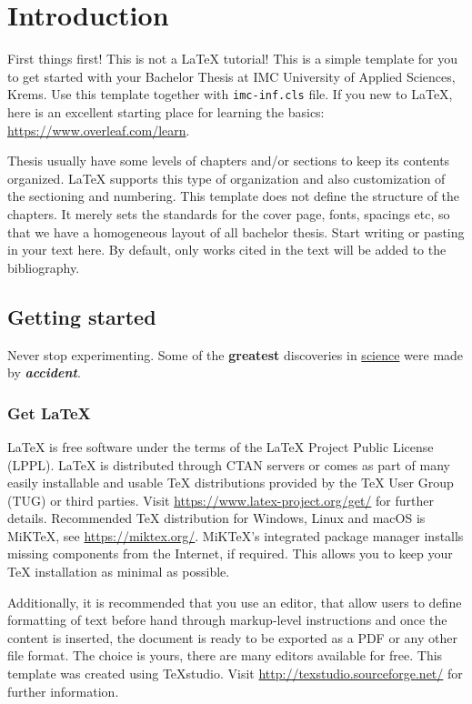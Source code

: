 \documentclass{imc-inf}
\begin{document}
\chapter{Introduction}\label{chap:introduction}


First things first! This is not a \LaTeX{} tutorial! This is a simple template for you to get started with your Bachelor Thesis at IMC University of Applied Sciences, Krems. Use this template together with \texttt{imc-inf.cls} file. If you new to \LaTeX{}, here is an excellent starting place for learning the basics: \url{https://www.overleaf.com/learn}.


Thesis usually have some levels of chapters and/or sections to keep its contents organized. \LaTeX{} supports this type of organization and also customization of the sectioning and numbering. This template does not define the structure of the chapters. It merely sets the standards for the cover page, fonts, spacings etc, so that we have a homogeneous layout of all bachelor thesis. Start writing or pasting in your text here. By default, only works cited in the text will be added to the bibliography. 

\section{Getting started}

Never stop experimenting. Some of the \textbf{greatest} discoveries in \underline{science} were made by \textbf{\textit{accident}}.

\subsection{Get \LaTeX{}}
\LaTeX{} is free software under the terms of the \LaTeX{} Project Public License (LPPL). \LaTeX{} is distributed through CTAN servers or comes as part of many easily installable and usable TeX distributions provided by the TeX User Group (TUG) or third parties. Visit \url{https://www.latex-project.org/get/} for further details. Recommended TeX distribution for Windows, Linux and macOS is MiKTeX, see \url{https://miktex.org/}. MiKTeX's integrated package manager installs missing components from the Internet, if required. This allows you to keep your TeX installation as minimal as possible. 

Additionally, it is recommended that you use an editor, that allow users to define formatting of text before hand through markup-level instructions and once the content is inserted, the document is ready to be exported as a PDF or any other file format. The choice is yours, there are many editors available for free. This template was created using TeXstudio. Visit \url{http://texstudio.sourceforge.net/} for further information. 
\end{document}

